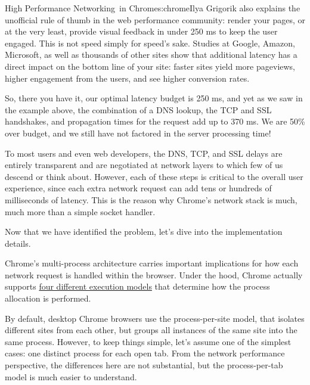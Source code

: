 \begin{aosachapter}{High Performance Networking~in Chrome}{s:chrome}{Ilya Grigorik}
 also explains the unofficial rule of
thumb in the web performance community: render your pages, or at the
very least, provide visual feedback in under 250 ms to keep the user
engaged. This is not speed simply for speed's sake. Studies at Google,
Amazon, Microsoft, as well as thousands of other sites show that
additional latency has a direct impact on the bottom line of your site:
faster sites yield more pageviews, higher engagement from the users, and
see higher conversion rates.

So, there you have it, our optimal latency budget is 250 ms, and yet as
we saw in the example above, the combination of a DNS lookup, the TCP
and SSL handshakes, and propagation times for the request add up to 370
ms. We are 50\% over budget, and we still have not factored in the
server processing time!

To most users and even web developers, the DNS, TCP, and SSL delays are
entirely transparent and are negotiated at network layers to which few
of us descend or think about. However, each of these steps is critical
to the overall user experience, since each extra network request can add
tens or hundreds of milliseconds of latency. This is the reason why
Chrome's network stack is much, much more than a simple socket handler.

Now that we have identified the problem, let's dive into the
implementation details.



Chrome's multi-process architecture carries important implications for
how each network request is handled within the browser. Under the hood,
Chrome actually supports
\href{http://www.chromium.org/developers/design-documents/process-models}{four
different execution models} that determine how the process allocation is
performed.

By default, desktop Chrome browsers use the process-per-site model, that
isolates different sites from each other, but groups all instances of
the same site into the same process. However, to keep things simple,
let's assume one of the simplest cases: one distinct process for each
open tab. From the network performance perspective, the differences here
are not substantial, but the process-per-tab model is much easier to
understand.



\end{aosachapter}
